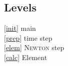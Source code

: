 % 
% 

\subsection{Levels}

\textcircled{\ref{init}} main\\
\textcircled{\ref{prep}} time step\\
\textcircled{\ref{elem}} \textsc{Newton} step\\
\textcircled{\ref{calc}} Element\\

